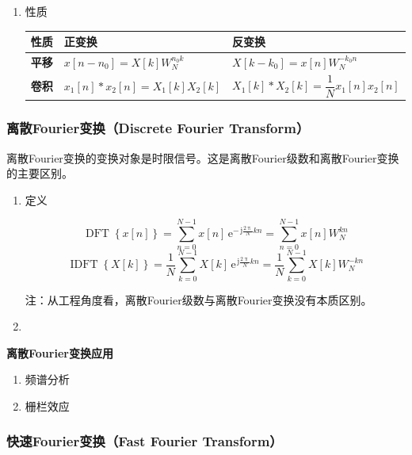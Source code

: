 \documentclass[UTF8,fontset=fandol,zihao=5]{ctexart}
\newcommand{\jj}{\,\mathrm{j}}
\newcommand{\ee}{\,\mathrm{e}}
\newcommand{\dft}{\operatorname{DFT}}
\newcommand{\idft}{\operatorname{IDFT}}
\begin{document}
\begin{enumerate}
  \item 性质
  \begin{center}
  \begin{table}[H]
    \centering
    \begin{tabularx}{\textwidth}{>{\bfseries}p{3cm} X X}
      \toprule
      性质 & 正变换 & 反变换 \\
      \midrule
      平移 & $x[n-n_0]=X[k]W_N^{n_0k}$
        & $X[k-k_0]=x[n]W_N^{-k_0n}$ \\[6pt]

      卷积 & $x_1[n] \ast x_2[n] = X_1[k]X_2[k]$
        & $X_1[k] \ast X_2[k] = \dfrac{1}{N} x_1[n]x_2[n]$ \\
      \bottomrule
    \end{tabularx}
  \end{table}
  \end{center}
\end{enumerate}

\subsubsection{离散Fourier变换（Discrete Fourier Transform）}

离散Fourier变换的变换对象是时限信号。这是离散Fourier级数和离散Fourier变换的主要区别。

\begin{enumerate}
  \item 定义
  
  \[
  \dft\left\{x[n]\right\} = \sum_{n=0}^{N-1} x[n] \ee^{-\jj\frac{2\uppi}{N}kn}
  = \sum_{n=0}^{N-1} x[n] W_N^{kn}
  \]
  \[
  \idft\left\{X[k]\right\} = \frac{1}{N} \sum_{k=0}^{N-1} X[k] \ee^{\jj\frac{2\uppi}{N}kn}
  = \frac{1}{N} \sum_{k=0}^{N-1} X[k] W_N^{-kn}
  \]

  注：从工程角度看，离散Fourier级数与离散Fourier变换没有本质区别。

  \item 
\end{enumerate}

\textbf{离散Fourier变换应用}

\begin{enumerate}
  \item 频谱分析
  
  \item 栅栏效应
\end{enumerate}

\subsubsection{快速Fourier变换（Fast Fourier Transform）}
\end{document}
